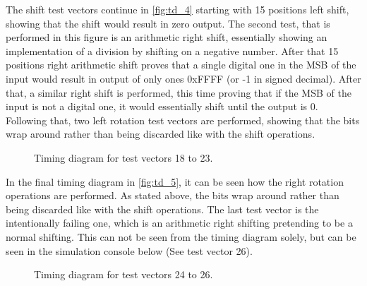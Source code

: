 \documentclass[10pt]{article}
\begin{document}
The shift test vectors continue in \autoref{fig:td_4} starting with 15 positions left shift, showing that the shift would result in zero output. 
The second test, that is performed in this figure is an arithmetic right shift, essentially showing an implementation of a division by shifting on a negative number. 
After that 15 positions right arithmetic shift proves that a single digital one in the MSB of the input would result in output of only ones 0xFFFF (or -1 in signed decimal). 
After that, a similar right shift is performed, this time proving that if the MSB of the input is not a digital one, it would essentially shift until the output is 0.
Following that, two left rotation test vectors are performed, showing that the bits wrap around rather than being discarded like with the shift operations.
\begin{figure}[ht]
    \centering
    \caption{Timing diagram for test vectors 18 to 23.}
    \label{fig:td_4}
\end{figure}
\newpage
In the final timing diagram in \autoref{fig:td_5}, it can be seen how the right rotation operations are performed. As stated above, the bits wrap around rather than being discarded like with the shift operations. 
The last test vector is the intentionally failing one, which is an arithmetic right shifting pretending to be a normal shifting. This can not be seen from the timing diagram solely, but can be seen in the simulation console below (See test vector 26).
\begin{figure}[ht]
    \centering
    \caption{Timing diagram for test vectors 24 to 26.}
    \label{fig:td_5}
\end{figure}
\newpage
\end{document}
